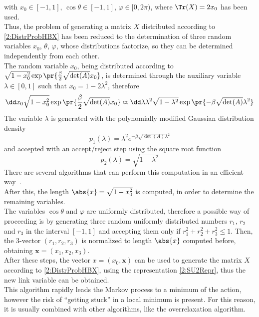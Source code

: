 with $x_0\in[-1,1]$, $\cos\theta\in[-1,1]$, $\varphi\in[0,2\pi)$, where $\Tr(X)=2x_0$ has been used.\\
Thus, the problem of generating a matrix $X$ distributed according to \eqref{2:DistrProbHBX} has been reduced to the determination of three random variables $x_0$, $\theta$, $\varphi$, whose distributions factorize, so they can be determined independently from each other.\\
The random variable $x_0$, being distributed according to $\sqrt{1-x_0^2} \exp\pr{\frac\beta2 \sqrt{\det(A)}x_0}$, is determined through the auxiliary variable $\lambda\in[0,1]$ such that $x_0 = 1-2\lambda^2$, therefore
\begin{equation}
    \dd x_0\sqrt{1-x_0^2} \exp\pr{\frac\beta2 \sqrt{\det(A)}x_0} \varpropto \dd\lambda\lambda^2\sqrt{1-\lambda^2} \exp\pr{-\beta \sqrt{\det(A)}\lambda^2} \label{2:LambdaDistrHB}
\end{equation}
The variable $\lambda$ is generated with the polynomially modified Gaussian distribution density
\begin{equation}
    p_1(\lambda) = \lambda^2 e^{-\beta \sqrt{\det(A)}\lambda^2}
\end{equation}
and accepted with an accept/reject step using the square root function
\begin{equation}
    p_2(\lambda) = \sqrt{1-\lambda^2}
\end{equation}
There are several algorithms that can perform this computation in an efficient way~\cite{1998art, luscher1994portable}.\\
After this, the length $\abs{x} = \sqrt{1-x_0^2}$ is computed, in order to determine the remaining variables.\\
The variables $\cos\theta$ and $\varphi$ are uniformly distributed, therefore a possible way of proceeding is by generating three random uniformly distributed numbers $r_1$, $r_2$ and $r_3$ in the interval $[-1,1]$ and accepting them only if $r_1^2+r_2^2+r_3^2\leq1$.
Then, the $3$-vector $(r_1,r_2,r_3)$ is normalized to length $\abs{x}$ computed before, obtaining $\bm{x} = (x_1,x_2,x_3)$.\\
After these steps, the vector $x=(x_0,\bm{x})$ can be used to generate the matrix $X$ according to \eqref{2:DistrProbHBX}, using the representation \eqref{2:SU2Repr}, thus the new link variable can be obtained.\\
This algorithm rapidly leads the Markov process to a minimum of the action, however the risk of ``getting stuck'' in a local minimum is present.
For this reason, it is usually combined with other algorithms, like the overrelaxation algorithm.


